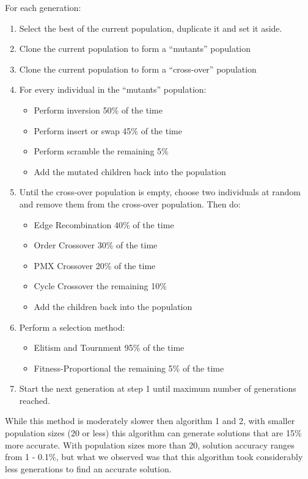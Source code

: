 \documentclass[a4paper,12pt]{article}
\begin{document}
For each generation:
\begin{enumerate}
\item Select the best of the current population, duplicate it and set it aside.
\item Clone the current population to form a ``mutants'' population
\item Clone the current population to form a ``cross-over'' population
\item For every individual in the ``mutants'' population:
\begin{itemize}
	\item Perform inversion 50\% of the time
	\item Perform insert or swap 45\% of the time
	\item Perform scramble the remaining 5\%
	\item Add the mutated children back into the population
\end{itemize}
\item Until the cross-over population is empty, choose two individuals at random and remove them from the cross-over population. Then do:
\begin{itemize}
	\item Edge Recombination 40\% of the time
	\item Order Crossover 30\% of the time
	\item PMX Crossover 20\% of the time
	\item Cycle Crossover the remaining 10\%
	\item Add the children back into the population
\end{itemize}
\item Perform a selection method:
\begin{itemize}
	\item Elitism and Tournment 95\% of the time
	\item Fitness-Proportional the remaining 5\% of the time
\end{itemize}
\item Start the next generation at step 1 until maximum number of generations reached.\\
\end{enumerate}

While this method is moderately slower then algorithm 1 and 2, with smaller population sizes (20 or less) this algorithm can generate solutions that are 15\% more accurate. With population sizes more than 20, solution accuracy ranges from 1 - 0.1\%, but what we observed was that this algorithm took considerably less generations to find an accurate solution. 
\end{document}
